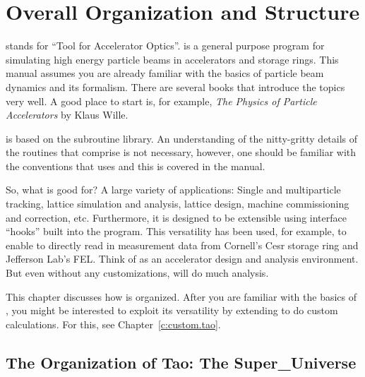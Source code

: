 \chapter{Overall Organization and Structure}
\label{c:organization}

\tao stands for ``Tool for Accelerator Optics''. \tao is a general
purpose program for simulating high energy particle beams in
accelerators and storage rings. This manual assumes you are already
familiar with the basics of particle beam dynamics and its
formalism. There are several books that introduce the topics very
well. A good place to start is, for example, \textit{The Physics of Particle
Accelerators} by Klaus Wille\cite{b:wille}.

\tao is based on the \bmad\cite{b:bmad} subroutine library. An
understanding of the nitty-gritty details of the routines that
comprise \bmad is not necessary, however, one should be familiar with
the conventions that \bmad uses and this is covered in the \bmad
manual.

So, what is \tao good for? A large variety of applications: Single and
multiparticle tracking, lattice simulation and analysis, lattice
design, machine commissioning and correction, etc. Furthermore, it is
designed to be extensible using interface ``hooks'' built into the
program.  This versatility has been used, for example, to enable \tao
to directly read in measurement data from Cornell's Cesr storage ring
and Jefferson Lab's FEL. Think of \tao as an accelerator design and
analysis environment. But even without any customizations, \tao will
do much analysis.

This chapter discusses how \tao is organized. After you are familiar
with the basics of \tao, you
might be interested to exploit its versatility by extending \tao to do
custom calculations. For this, see Chapter~\ref{c:custom.tao}.

\section{The Organization of Tao: The Super\_Universe}
\label{s:organization}

